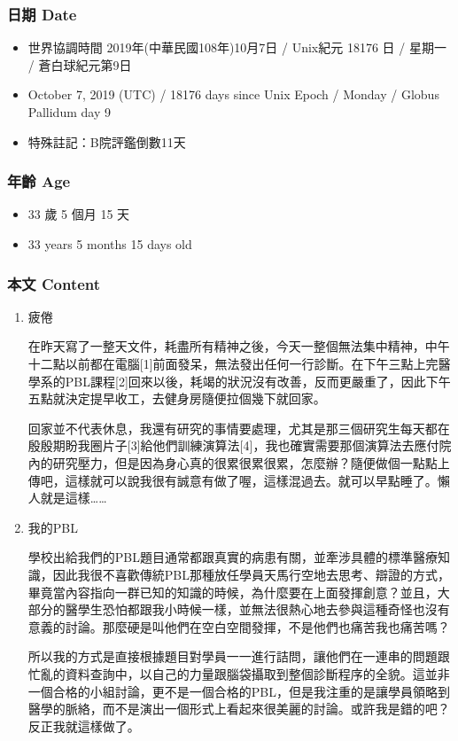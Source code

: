 \documentclass[a5paper, 12pt
]{book}
\providecommand{\tightlist}{%
  \setlength{\itemsep}{0pt}\setlength{\parskip}{0pt}}
\begin{document}
\hypertarget{ux65e5ux671f-date-8}{%
\subsubsection{日期 Date}\label{ux65e5ux671f-date-8}}

\begin{itemize}
\tightlist
\item
  世界協調時間 2019年(中華民國108年)10月7日 / Unix紀元 18176 日 / 星期一
  / 蒼白球紀元第9日
\item
  October 7, 2019 (UTC) / 18176 days since Unix Epoch / Monday / Globus
  Pallidum day 9
\item
  特殊註記：B院評鑑倒數11天
\end{itemize}

\hypertarget{ux5e74ux9f61-age-8}{%
\subsubsection{年齡 Age}\label{ux5e74ux9f61-age-8}}

\begin{itemize}
\tightlist
\item
  33 歲 5 個月 15 天
\item
  33 years 5 months 15 days old
\end{itemize}

\hypertarget{ux672cux6587-content-8}{%
\subsubsection{本文 Content}\label{ux672cux6587-content-8}}

\begin{enumerate}
\def\labelenumi{\arabic{enumi}.}
\item
  疲倦

  在昨天寫了一整天文件，耗盡所有精神之後，今天一整個無法集中精神，中午十二點以前都在電腦{[}1{]}前面發呆，無法發出任何一行診斷。在下午三點上完醫學系的PBL課程{[}2{]}回來以後，耗竭的狀況沒有改善，反而更嚴重了，因此下午五點就決定提早收工，去健身房隨便拉個幾下就回家。

  回家並不代表休息，我還有研究的事情要處理，尤其是那三個研究生每天都在殷殷期盼我圈片子{[}3{]}給他們訓練演算法{[}4{]}，我也確實需要那個演算法去應付院內的研究壓力，但是因為身心真的很累很累很累，怎麼辦？隨便做個一點點上傳吧，這樣就可以說我很有誠意有做了喔，這樣混過去。就可以早點睡了。懶人就是這樣\ldots\ldots{}
\item
  我的PBL

  學校出給我們的PBL題目通常都跟真實的病患有關，並牽涉具體的標準醫療知識，因此我很不喜歡傳統PBL那種放任學員天馬行空地去思考、辯證的方式，畢竟當內容指向一群已知的知識的時候，為什麼要在上面發揮創意？並且，大部分的醫學生恐怕都跟我小時候一樣，並無法很熱心地去參與這種奇怪也沒有意義的討論。那麼硬是叫他們在空白空間發揮，不是他們也痛苦我也痛苦嗎？

  所以我的方式是直接根據題目對學員一一進行詰問，讓他們在一連串的問題跟忙亂的資料查詢中，以自己的力量跟腦袋攝取到整個診斷程序的全貌。這並非一個合格的小組討論，更不是一個合格的PBL，但是我注重的是讓學員領略到醫學的脈絡，而不是演出一個形式上看起來很美麗的討論。或許我是錯的吧？反正我就這樣做了。
\end{enumerate}
\end{document}
